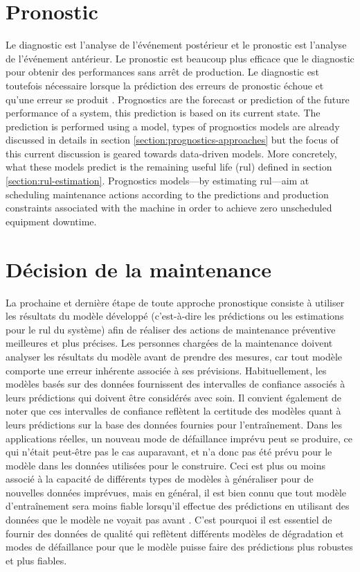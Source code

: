 \section{Pronostic}
Le diagnostic est l'analyse de l'événement postérieur et le pronostic est l'analyse de l'événement antérieur. Le pronostic est beaucoup plus efficace que le diagnostic pour obtenir des performances sans arrêt de production. Le diagnostic est toutefois nécessaire lorsque la prédiction des erreurs de pronostic échoue et qu'une erreur se produit \cite{Jardine2006}.
Prognostics are the forecast or prediction of the future performance of a system, this prediction is based on its current state. The prediction is performed using a model, types of prognostics models are already discussed in details in section \ref{section:prognostics-approaches} but the focus of this current discussion is geared towards data-driven models. More concretely, what these models predict is the remaining useful life (\acrshort{rul}) defined in section \ref{section:rul-estimation}. Prognostics models—by estimating \acrshort{rul}—aim at scheduling maintenance actions according to the predictions and production constraints associated with the machine in order to achieve zero unscheduled equipment downtime.

\section{Décision de la maintenance}
La prochaine et dernière étape de toute approche pronostique consiste à utiliser les résultats du modèle développé (c'est-à-dire les prédictions ou les estimations pour le \acrshort{rul} du système) afin de réaliser des actions de maintenance préventive meilleures et plus précises. Les personnes chargées de la maintenance doivent analyser les résultats du modèle avant de prendre des mesures, car tout modèle comporte une erreur inhérente associée à ses prévisions. Habituellement, les modèles basés sur des données fournissent des intervalles de confiance associés à leurs prédictions qui doivent être considérés avec soin. Il convient également de noter que ces intervalles de confiance reflètent la certitude des modèles quant à leurs prédictions sur la base des données fournies pour l'entraînement. Dans les applications réelles, un nouveau mode de défaillance imprévu peut se produire, ce qui n'était peut-être pas le cas auparavant, et n'a donc pas été prévu pour le modèle dans les données utilisées pour le construire. Ceci est plus ou moins associé à la capacité de différents types de modèles à généraliser pour de nouvelles données imprévues, mais en général, il est bien connu que tout modèle d'entraînement sera moins fiable lorsqu'il effectue des prédictions en utilisant des données que le modèle ne voyait pas avant \cite{Chung2018}. C'est pourquoi il est essentiel de fournir des données de qualité qui reflètent différents modèles de dégradation et modes de défaillance pour que le modèle puisse faire des prédictions plus robustes et plus fiables.

